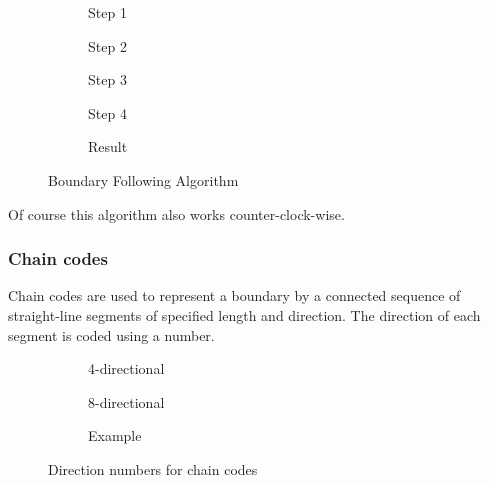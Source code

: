 \begin{figure}[h]
	\centering
	\begin{subfigure}[b]{0.19\textwidth}
		\centering
		\caption{Step 1}
	\end{subfigure}
	\begin{subfigure}[b]{0.19\textwidth}
		\centering
		\caption{Step 2}
	\end{subfigure}
	\begin{subfigure}[b]{0.19\textwidth}
		\centering
		\caption{Step 3}
	\end{subfigure}
	\begin{subfigure}[b]{0.19\textwidth}
		\centering
		\caption{Step 4}
	\end{subfigure}
	\begin{subfigure}[b]{0.19\textwidth}
		\centering
		\caption{Result}
	\end{subfigure}
	\caption{Boundary Following Algorithm}
\end{figure}
Of course this algorithm also works counter-clock-wise.

\subsubsection{Chain codes}
Chain codes are used to represent a boundary by a connected sequence of straight-line segments of specified length and direction. The direction of each segment is coded using a number.
\begin{figure}[h]
	\centering
	\begin{subfigure}[b]{0.3\textwidth}
		\centering
		\caption{4-directional}
	\end{subfigure}
	\begin{subfigure}[b]{0.3\textwidth}
		\centering
		\caption{8-directional}
	\end{subfigure}
	\begin{subfigure}[b]{0.3\textwidth}
		\centering
		
		\caption{Example}
		\label{fig:chaincode_example}
	\end{subfigure}
	\caption{Direction numbers for chain codes}
\end{figure}

